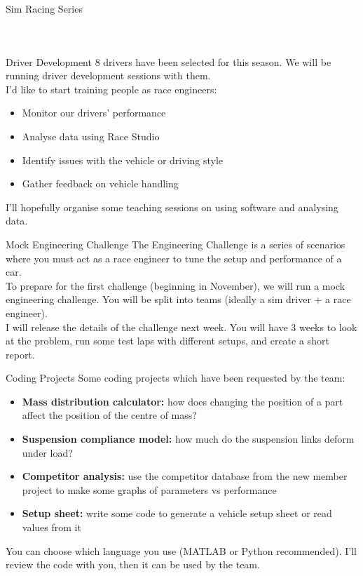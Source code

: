 \begin{frame}{Sim Racing Series}
\begin{columns}
\begin{figure}
        \end{figure}
    \end{columns}
\end{frame}

\begin{frame}{Driver Development}
    8 drivers have been selected for this season.
    We will be running driver development sessions with them. \\
    \vspace{2ex}
    I'd like to start training people as race engineers:
    \begin{itemize}
        \item Monitor our drivers' performance
        \item Analyse data using Race Studio
        \item Identify issues with the vehicle or driving style
        \item Gather feedback on vehicle handling
    \end{itemize}
    I'll hopefully organise some teaching sessions
    on using software and analysing data.
\end{frame}

\begin{frame}{Mock Engineering Challenge}
    The Engineering Challenge is a series of scenarios
    where you must act as a race engineer
    to tune  the setup and performance of a car. \\
    \vspace{2ex}
    To prepare for the first challenge (beginning in November),
    we will run a mock engineering challenge.
    You will be split into teams
    (ideally a sim driver + a race engineer). \\
    \vspace{2ex}
    I will release the details of the challenge next week.
    You will have 3 weeks to look at the problem,
    run some test laps with different setups,
    and create a short report.
\end{frame}

\begin{frame}{Coding Projects}
    Some coding projects which have been requested by the team:
    \begin{itemize}
        \item \textbf{Mass distribution calculator:}
        how does changing the position of a part
        affect the position of the centre of mass?
        \item \textbf{Suspension compliance model:}
        how much do the suspension links deform under load?
        \item \textbf{Competitor analysis:}
        use the competitor database from the new member project
        to make some graphs of parameters vs performance
        \item \textbf{Setup sheet:}
        write some code to generate a vehicle setup sheet
        or read values from it
    \end{itemize}
    You can choose which language you use
    (MATLAB or Python recommended).
    I'll review the code with you,
    then it can be used by the team.
\end{frame}